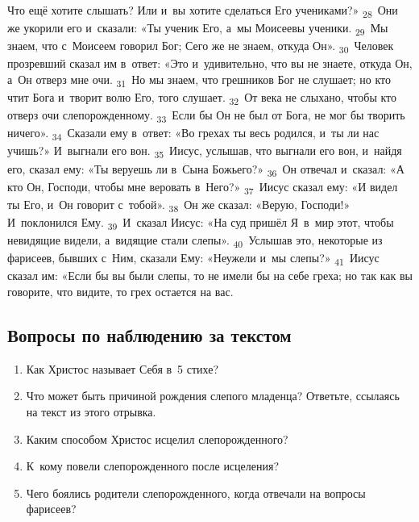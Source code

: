 \documentclass[a4paper,12pt]{article}
\begin{document}
Что ещё хотите слышать? Или и~вы хотите сделаться Его учениками?» \textsubscript{28}~Они же укорили его и~сказали: «Ты ученик Его, а~мы Моисеевы ученики. \textsubscript{29}~Мы знаем, что с~Моисеем говорил Бог; Сего же не знаем, откуда Он». \textsubscript{30}~Человек прозревший сказал им в~ответ: «Это и~удивительно, что вы не знаете, откуда Он, а~Он отверз мне очи. \textsubscript{31}~Но мы знаем, что грешников Бог не слушает; но кто чтит Бога и~творит волю Его, того слушает. \textsubscript{32}~От века не слыхано, чтобы кто отверз очи слепорожденному. \textsubscript{33}~Если бы Он не был от Бога, не мог бы творить ничего». \textsubscript{34}~Сказали ему в~ответ: «Во грехах ты весь родился, и~ты ли нас учишь?» И~выгнали его вон. \textsubscript{35}~Иисус, услышав, что выгнали его вон, и~найдя его, сказал ему: «Ты веруешь ли в~Сына Божьего?» \textsubscript{36}~Он отвечал и~сказал: «А кто Он, Господи, чтобы мне веровать в~Него?» \textsubscript{37}~Иисус сказал ему: «И видел ты Его, и~Он говорит с~тобой». \textsubscript{38}~Он же сказал: «Верую, Господи!» И~поклонился Ему. \textsubscript{39}~И~сказал Иисус: «На суд пришёл Я~в~мир этот, чтобы невидящие видели, а~видящие стали слепы». \textsubscript{40}~Услышав это, некоторые из фарисеев, бывших с~Ним, сказали Ему: «Неужели и~мы слепы?» \textsubscript{41}~Иисус сказал им: «Если бы вы были слепы, то не имели бы на себе греха; но так как вы говорите, что видите, то грех остается на вас. 

\subsection*{Вопросы по наблюдению за текстом}
\begin{enumerate}
    \item Как Христос называет Себя в~5 стихе? 
    
    \myline
    
    \item Что может быть причиной рождения слепого младенца? Ответьте, ссылаясь на текст из этого отрывка. 
    
    \myline
    
    \myline
    \item Каким способом Христос исцелил слепорожденного? 
    
    \myline
    
    \myline
    \item К~кому повели слепорожденного после исцеления? 
    
    \myline
    
    \myline
    \item Чего боялись родители слепорожденного, когда отвечали на вопросы фарисеев? 
    
    \myline
    
    \myline
\end{enumerate}
\end{document}
